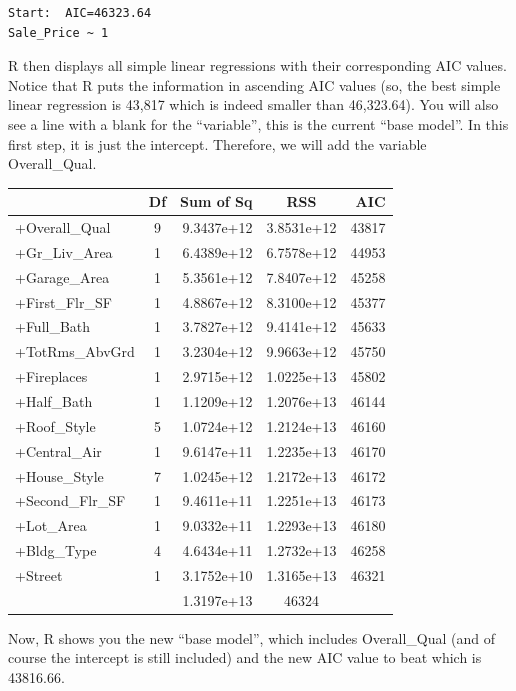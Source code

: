 \documentclass[
  letterpaper,
  DIV=11,
  numbers=noendperiod]{scrreprt}
\begin{document}
\begin{verbatim}
Start:  AIC=46323.64
Sale_Price ~ 1
\end{verbatim}

R then displays all simple linear regressions with their corresponding
AIC values. Notice that R puts the information in ascending AIC values
(so, the best simple linear regression is 43,817 which is indeed smaller
than 46,323.64). You will also see a line with a blank for the
``variable'', this is the current ``base model''. In this first step, it
is just the intercept. Therefore, we will add the variable
Overall\_Qual.

\begin{longtable}[]{@{}lcrcr@{}}
\toprule()
& Df & Sum of Sq & RSS & AIC \\
\midrule()
\endhead
+Overall\_Qual & 9 & 9.3437e+12 & 3.8531e+12 & 43817 \\
+Gr\_Liv\_Area & 1 & 6.4389e+12 & 6.7578e+12 & 44953 \\
+Garage\_Area & 1 & 5.3561e+12 & 7.8407e+12 & 45258 \\
+First\_Flr\_SF & 1 & 4.8867e+12 & 8.3100e+12 & 45377 \\
+Full\_Bath & 1 & 3.7827e+12 & 9.4141e+12 & 45633 \\
+TotRms\_AbvGrd & 1 & 3.2304e+12 & 9.9663e+12 & 45750 \\
+Fireplaces & 1 & 2.9715e+12 & 1.0225e+13 & 45802 \\
+Half\_Bath & 1 & 1.1209e+12 & 1.2076e+13 & 46144 \\
+Roof\_Style & 5 & 1.0724e+12 & 1.2124e+13 & 46160 \\
+Central\_Air & 1 & 9.6147e+11 & 1.2235e+13 & 46170 \\
+House\_Style & 7 & 1.0245e+12 & 1.2172e+13 & 46172 \\
+Second\_Flr\_SF & 1 & 9.4611e+11 & 1.2251e+13 & 46173 \\
+Lot\_Area & 1 & 9.0332e+11 & 1.2293e+13 & 46180 \\
+Bldg\_Type & 4 & 4.6434e+11 & 1.2732e+13 & 46258 \\
+Street & 1 & 3.1752e+10 & 1.3165e+13 & 46321 \\
& & 1.3197e+13 & 46324 & \\
\bottomrule()
\end{longtable}

Now, R shows you the new ``base model'', which includes Overall\_Qual
(and of course the intercept is still included) and the new AIC value to
beat which is 43816.66.
\end{document}
